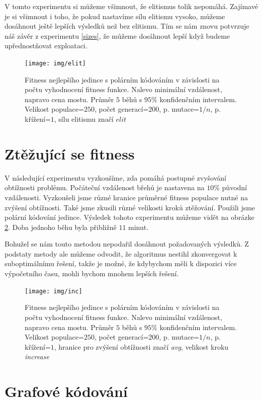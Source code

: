V tomto experimentu si můžeme všimnout, že elitismus tolik nepomáhá. Zajímavé je si všimnout i toho, že pokud nastavíme sílu elitismu vysoko, můžeme dosáhnout ještě lepších výsledků než bez elitismu. Tím se nám znovu potvrzuje náš závěr z experimentu \ref{sizes}, že můžeme dosáhnout lepší když budeme upřednostňovat exploataci.

\begin{figure}[p]\centering
\texttt{[image: img/elit]}
\caption{Fitness nejlepšího jedince s polárním kódováním v závislosti na počtu vyhodnocení fitness funkce. Nalevo minimální vzdálenost, napravo cena mostu. Průměr $5$ běhů s $95\%$ konfidenčním intervalem. Velikost populace=$250$, počet generací=$200$, p. mutace=$1/n$, p. křížení=$1$, sílu elitismu značí $elit$}
\label{exp:5}
\end{figure}


\section{Ztěžující se fitness} \label{inc}

V následující experimentu vyzkoušíme, zda pomáhá postupné zvyšování obtížnosti problému. Počáteční vzdálenost břehů je nastavena na $10\%$ původní vzdálenosti. Vyzkoušeli jsme různé hranice průměrné fitness populace nutné na zvýšení obtížnosti. Také jsme zkusili různé velikosti kroků ztěžování. Použili jsme polární kódování jedince. Výsledek tohoto experimentu můžeme vidět na obrázke \ref{exp:6}. Doba jednoho běhu byla přibližně $11$ minut.

Bohužel se nám touto metodou nepodařil dosáhnout požadovaných výsledků. Z podstaty metody ale můžeme odvodit, že algoritmus nestihl zkonvergovat k suboptimálnímu řešení, takže je možné, že kdybychom měli k dispozici více výpočetního času, mohli bychom mnohem lepších řešení.

\begin{figure}[p]\centering
\texttt{[image: img/inc]}
\caption{Fitness nejlepšího jedince s polárním kódováním v závislosti na počtu vyhodnocení fitness funkce. Nalevo minimální vzdálenost, napravo cena mostu. Průměr $5$ běhů s $95\%$ konfidenčním intervalem. Velikost populace=$250$, počet generací=$200$, p. mutace=$1/n$, p. křížení=$1$, hranice pro zvýšení obtížnosti značí \emph{avg}, velikost kroku \emph{increase}}
\label{exp:6}
\end{figure}

\section{Grafové kódování}

